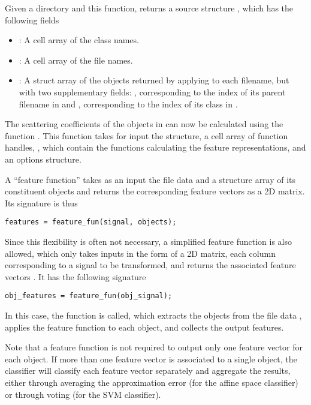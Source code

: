 \documentclass[twocolumn]{article}
\begin{document}
Given a directory and this function,  returns a source structure , which has the following fields
\begin{itemize}
	\item {}: A cell array of the class names.
	\item {}: A cell array of the file names.
	\item {}: A struct array of the objects returned by applying  to each filename, but with two supplementary fields: , corresponding to the index of its parent filename in  and , corresponding to the index of its class in .
\end{itemize}

The scattering coefficients of the objects in  can now be calculated using the function . This function takes for input the  structure, a cell array of function handles, , which contain the functions calculating the feature representations, and an options structure.

A ``feature function'' takes as an input the file data and a structure array of its constituent objects and returns the corresponding feature vectors as a 2D matrix. Its signature is thus
\begin{lstlisting}
features = feature_fun(signal, objects);
\end{lstlisting}
Since this flexibility is often not necessary, a simplified feature function is also allowed, which only takes inputs  in the form of a 2D matrix, each column corresponding to a signal to be transformed, and returns the associated feature vectors . It has the following signature
\begin{lstlisting}
obj_features = feature_fun(obj_signal);
\end{lstlisting}
In this case, the function  is called, which extracts the objects from the file data , applies the feature function to each object, and collects the output features.

Note that a feature function is not required to output only one feature vector for each object. If more than one feature vector is associated to a single object, the classifier will classify each feature vector separately and aggregate the results, either through averaging the approximation error (for the affine space classifier) or through voting (for the SVM classifier).
\end{document}
